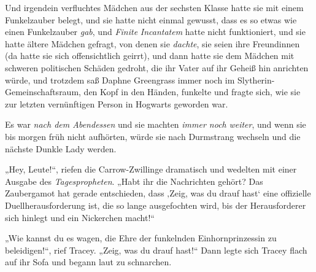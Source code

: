 Und irgendein verfluchtes Mädchen aus der sechsten Klasse hatte sie mit einem Funkelzauber belegt, und sie hatte nicht einmal gewusst, dass es so etwas wie einen Funkelzauber \emph{gab}, und \emph{Finite} \emph{Incantatem} hatte nicht funktioniert, und sie hatte ältere Mädchen gefragt, von denen sie \emph{dachte}, sie seien ihre Freundinnen (da hatte sie sich offensichtlich geirrt), und dann hatte sie dem Mädchen mit schweren politischen Schäden gedroht, die ihr Vater auf ihr Geheiß hin anrichten würde, und trotzdem saß Daphne Greengrass immer noch im Slytherin-Gemeinschaftsraum, den Kopf in den Händen, funkelte und fragte sich, wie sie zur letzten vernünftigen Person in Hogwarts geworden war.

Es war \emph{nach dem Abendessen} und sie machten \emph{immer noch} \emph{weiter}, und wenn sie bis morgen früh nicht aufhörten, würde sie nach Durmstrang wechseln und die nächste Dunkle Lady werden.

„Hey, Leute!“, riefen die Carrow-Zwillinge dramatisch und wedelten mit einer Ausgabe des \emph{Tagespropheten}. „Habt ihr die Nachrichten gehört? Das Zaubergamot hat gerade entschieden, dass ‚Zeig, was du drauf hast‘ eine offizielle Duellherausforderung ist, die so lange ausgefochten wird, bis der Herausforderer sich hinlegt und ein Nickerchen macht!“

„Wie kannst du es wagen, die Ehre der funkelnden Einhornprinzessin zu beleidigen!“, rief Tracey. „Zeig, was du drauf hast!“ Dann legte sich Tracey flach auf ihr Sofa und begann laut zu schnarchen.


